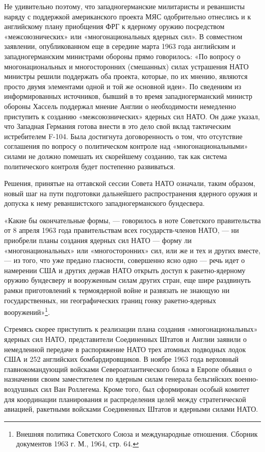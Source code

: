 \documentclass[12pt, a4paper, openany]{book}
\begin{document}
Не удивительно поэтому, что западногерманские милитаристы и реваншисты наряду с поддержкой американского проекта МЯС одобрительно отнеслись и к английскому плану приобщения ФРГ к ядерному оружию посредством «межсоюзнических» или «многонациональных ядерных сил». В совместном заявлении, опубликованном еще в середине марта 1963 года английским и западногерманским министрами обороны прямо говорилось: «По вопросу о многонациональных и многосторонних (смешанных) силах устрашения НАТО министры решили поддержать оба проекта, которые, по их мнению, являются просто двумя элементами одной и той же основной идеи». По сведениям из информированных источников, бывший в то время западногерманский министр обороны Хассель поддержал мнение Англии о необходимости немедленно приступить к созданию «межсоюзнических» ядерных сил НАТО. Он даже указал, что Западная Германия готова внести в это дело свой вклад тактическим истребителем F-104. Была достигнута договоренность о том, что отсутствие соглашения по вопросу о политическом контроле над «многонациональными» силами не должно помешать их скорейшему созданию, так как система политического контроля будет постепенно развиваться.
	

Решения, принятые на оттавской сессии Совета НАТО означали, таким образом, новый шаг на пути подготовки дальнейшего распространения ядерного оружия и допуска к нему реваншистского западногерманского бундесвера.

«Какие бы окончательные формы, — говорилось в ноте Советского правительства от 8 апреля 1963 года правительствам всех государств-членов НАТО, — ни приобрели планы создания ядерных сил НАТО — форму ли «многонациональных» или «многосторонних» сил, или же и тех и других вместе, — из того, что уже предано гласности, совершенно ясно одно — речь идет о намерении США и других держав НАТО открыть доступ к ракетно-ядерному оружию бундесверу и вооруженным силам других стран, еще шире раздвинуть рамки приготовлений к термоядерной войне и развязать не знающую ни государственных, ни географических границ гонку ракетно-ядерных вооружений»{\footnote{Внешняя политика Советского Союза и международные отношения. Сборник документов 1963 г. М., 1964, стр. 64.}}.

	
Стремясь скорее приступить к реализации плана создания «многонациональных» ядерных сил НАТО, представители Соединенных Штатов и Англии заявили о немедленной передаче в распоряжение НАТО трех атомных подводных лодок США и 252 английских бомбардировщиков. В ноябре 1963 года верховный главнокомандующий войсками Североатлантического блока в Европе объявил о назначении своим заместителем по ядерным силам генерала бельгийских военно-воздушных сил Ван Роллегема. Кроме того, был сформирован особый комитет для координации планирования и распределения целей между стратегической авиацией, ракетными войсками Соединенных Штатов и ядерными силами НАТО.
	
\end{document}
